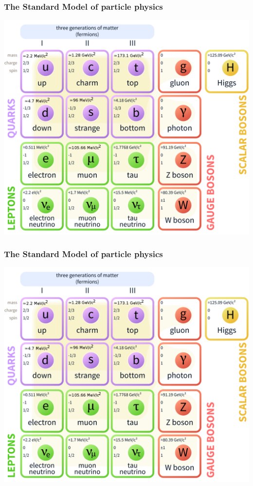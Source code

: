 \documentclass[9pt]{beamer}
\begin{document}
\frame
{
  \frametitle{ The Standard Model of particle physics}

\begin{center}
\includegraphics[scale = 0.2]{SM.png}
\end{center}
}



\frame
{
  \frametitle{ The Standard Model of particle physics}

\begin{center}
\includegraphics[scale = 0.2]{SM.png}
\end{center}
}
\end{document}
